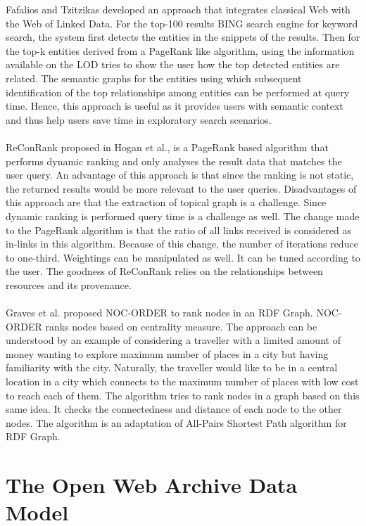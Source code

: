 \documentclass[runningheads,a4paper]{libtex/llncs}
\begin{document}
Fafalios and Tzitzikas\cite{fafalios2014post} developed an approach that integrates classical Web with the Web of Linked Data. For the top-100 results BING search engine for keyword search, the system first detects the entities in the snippets of the results. Then for the top-k entities derived from a PageRank like algorithm, using the information available on the LOD tries to show the user how the top detected entities are related. The semantic graphs for the entities using which subsequent identification of the top relationships among entities can be performed at query time. Hence, this approach is useful as it provides users with semantic context and thus help users save time in exploratory search scenarios.
\\\\
ReConRank proposed in Hogan et al.\cite{hogan2006reconrank}, is a PageRank based algorithm that performs dynamic ranking and only analyses the result data that matches the user query. An advantage of this approach is that since the ranking is not static, the returned results would be more relevant to the user queries. Disadvantages of this approach are that the extraction of topical graph is a challenge. Since dynamic ranking is performed query time is a challenge as well. The change made to the PageRank algorithm is that the ratio of all links received is considered as in-links in this algorithm. Because of this change, the number of iterations reduce to one-third. Weightings can be manipulated as well. It can be tuned according to the user. The goodness of ReConRank relies on the relationships between resources and its provenance.
\\\\
Graves et al.\cite{graves2008method} proposed NOC-ORDER to rank nodes in an RDF Graph. NOC- ORDER ranks nodes based on centrality measure. The approach can be understood by an example of considering a traveller with a limited amount of money wanting to explore maximum number of places in a city but having familiarity with the city. Naturally, the traveller would like to be in a central location in a city which connects to the maximum number of places with low cost to reach each of them. The algorithm tries to rank nodes in a graph based on this same idea. It checks the connectedness and distance of each node to the other nodes. The algorithm is an adaptation of All-Pairs Shortest Path algorithm for RDF Graph.




\section{The Open Web Archive Data Model}
\label{sec:semanticmodel}
\end{document}
